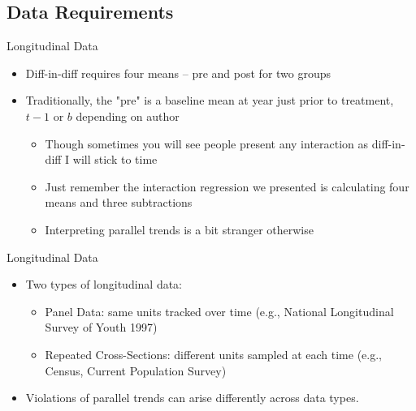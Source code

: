 \documentclass{beamer}
\begin{document}
\subsection{Data Requirements}

\begin{frame}{Longitudinal Data}

\begin{itemize}

\item Diff-in-diff requires four means -- pre and post for two groups
\item Traditionally, the "pre" is a baseline mean at year just prior to treatment, $t-1$ or $b$ depending on author
	\begin{itemize}
	\item Though sometimes you will see people present any interaction as diff-in-diff I will stick to time
	\item Just remember the interaction regression we presented is calculating four means and three subtractions
	\item Interpreting parallel trends is a bit stranger otherwise
	\end{itemize}
\end{itemize}

\end{frame}

\begin{frame}{Longitudinal Data}

\begin{itemize}

\item Two types of longitudinal data:
    \begin{itemize}
      \item Panel Data: same units tracked over time (e.g., National Longitudinal Survey of Youth 1997)
      \item Repeated Cross-Sections: different units sampled at each time (e.g., Census, Current Population Survey)
    \end{itemize}
    \item Violations of parallel trends can arise differently across data types.
\end{itemize}

\end{frame}
\end{document}

